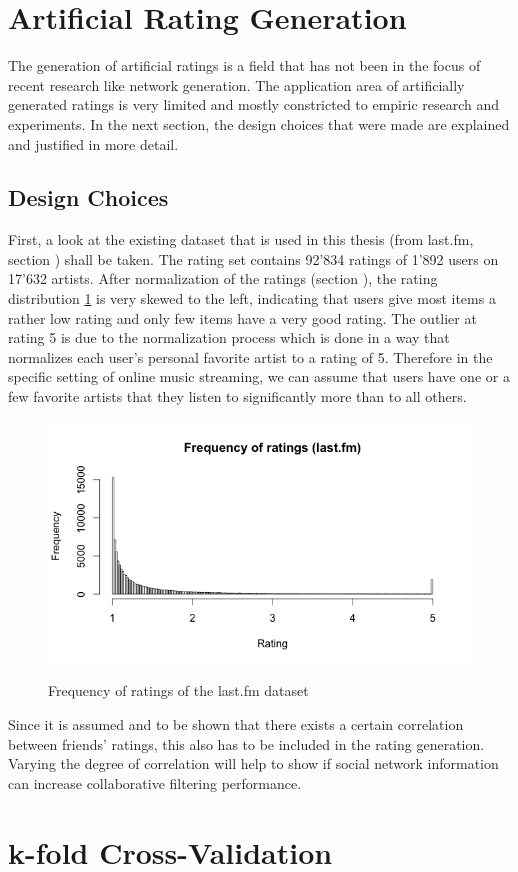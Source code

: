 \section{Artificial Rating Generation}
\label{st:artificialratinggeneration} The generation of artificial ratings is a field that has not been in the focus of recent research like network generation. The application area of artificially generated ratings is very limited and mostly constricted to empiric research and experiments. In the next section, the design choices that were made are explained and justified in more detail.

\subsection{Design Choices}
\label{sst:designchoices} First, a look at the existing dataset that is used in this thesis (from last.fm, section %
) shall be taken. The rating set contains 92'834 ratings of 1'892 users on 17'632 artists. After normalization of the ratings (section %
), the rating distribution \ref{f:frequencyofratings} is very skewed to the left, indicating that users give most items a rather low rating and only few items have a very good rating. The outlier at rating 5 is due to the normalization process which is done in a way that normalizes each user's personal favorite artist to a rating of 5. Therefore in the specific setting of online music streaming, we can assume that users have one or a few favorite artists that they listen to significantly more than to all others.

\begin{figure}[!ht]
\centering
\includegraphics[width=425px]{./3-artificialdata/figures/FrequencyOfRatings_Lastfm.png}
\label{f:frequencyofratings}
\caption{Frequency of ratings of the last.fm dataset}
\end{figure}

Since it is assumed and to be shown that there exists a certain correlation between friends' ratings, this also has to be included in the rating generation. Varying the degree of correlation will help to show if social network information can increase collaborative filtering performance.

\section{k-fold Cross-Validation}
\label{st:kfoldcrossvalidation} 